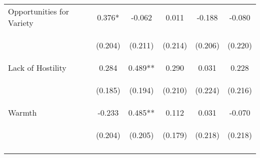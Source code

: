 \begin{tabular}{lccccc}
\noalign{\smallskip}Opportunities for Variety & 0.376* & -0.062 & 0.011 & -0.188 & -0.080\\
 & \begin{footnotesize}(0.204)\end{footnotesize} & \begin{footnotesize}(0.211)\end{footnotesize} & \begin{footnotesize}(0.214)\end{footnotesize} & \begin{footnotesize}(0.206)\end{footnotesize} & \begin{footnotesize}(0.220)\end{footnotesize}\\
\noalign{\smallskip}Lack of Hostility & 0.284 & 0.489** & 0.290 & 0.031 & 0.228\\
 & \begin{footnotesize}(0.185)\end{footnotesize} & \begin{footnotesize}(0.194)\end{footnotesize} & \begin{footnotesize}(0.210)\end{footnotesize} & \begin{footnotesize}(0.224)\end{footnotesize} & \begin{footnotesize}(0.216)\end{footnotesize}\\
\noalign{\smallskip}Warmth & -0.233 & 0.485** & 0.112 & 0.031 & -0.070\\
 & \begin{footnotesize}(0.204)\end{footnotesize} & \begin{footnotesize}(0.205)\end{footnotesize} & \begin{footnotesize}(0.179)\end{footnotesize} & \begin{footnotesize}(0.218)\end{footnotesize} & \begin{footnotesize}(0.218)\end{footnotesize}\\
\noalign{\smallskip}\hline\end{tabular}\\
